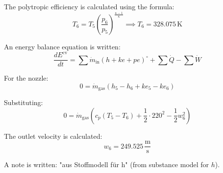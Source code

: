 The polytropic efficiency is calculated using the formula:  
\[
T_6 = T_5 \left( \frac{p_6}{p_5} \right)^{\frac{\kappa - 1}{\kappa}} \implies T_6 = 328.075 \, \text{K}
\]

An energy balance equation is written:  
\[
\frac{dE^{\text{cv}}}{dt} = \sum \dot{m}_{\text{in}} \left( h + ke + pe \right)^{\circ} + \sum \dot{Q} - \sum \dot{W}
\]

For the nozzle:  
\[
0 = \dot{m}_{\text{gas}} \left( h_5 - h_6 + ke_5 - ke_6 \right)
\]

Substituting:  
\[
0 = \dot{m}_{\text{gas}} \left( c_p \left( T_5 - T_6 \right) + \frac{1}{2} \cdot 220^2 - \frac{1}{2} w_6^2 \right)
\]

The outlet velocity is calculated:  
\[
w_6 = 249.525 \, \frac{\text{m}}{\text{s}}
\]

A note is written: "aus Stoffmodell für h" (from substance model for \( h \)).